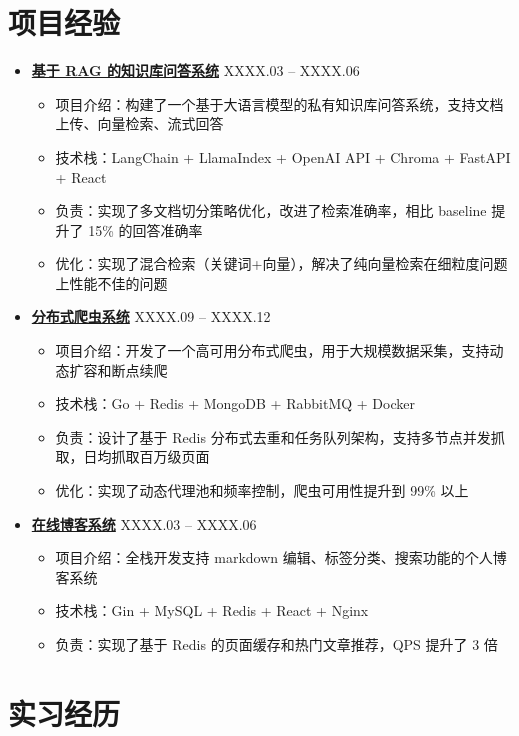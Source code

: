 \documentclass[11pt,a4paper]{article}
\newcommand{\resumeItem}[1]{\item #1}
\newcommand{\resumeProjectHeading}[2]{
  \vspace{-2pt}
  \item
  \textbf{#1} \hfill #2
  \vspace{-5pt}
}
\begin{document}
\section{项目经验}

\begin{itemize}

  \resumeProjectHeading
    {\href{https://github.com/yourusername/project1}{基于 RAG 的知识库问答系统}}{XXXX.03 -- XXXX.06}
  \begin{itemize}
    \resumeItem{项目介绍：构建了一个基于大语言模型的私有知识库问答系统，支持文档上传、向量检索、流式回答}
    \resumeItem{技术栈：LangChain + LlamaIndex + OpenAI API + Chroma + FastAPI + React}
    \resumeItem{负责：实现了多文档切分策略优化，改进了检索准确率，相比 baseline 提升了 15\% 的回答准确率}
    \resumeItem{优化：实现了混合检索（关键词+向量），解决了纯向量检索在细粒度问题上性能不佳的问题}
  \end{itemize}

  \resumeProjectHeading
    {\href{https://github.com/yourusername/project2}{分布式爬虫系统}}{XXXX.09 -- XXXX.12}
  \begin{itemize}
    \resumeItem{项目介绍：开发了一个高可用分布式爬虫，用于大规模数据采集，支持动态扩容和断点续爬}
    \resumeItem{技术栈：Go + Redis + MongoDB + RabbitMQ + Docker}
    \resumeItem{负责：设计了基于 Redis 分布式去重和任务队列架构，支持多节点并发抓取，日均抓取百万级页面}
    \resumeItem{优化：实现了动态代理池和频率控制，爬虫可用性提升到 99\% 以上}
  \end{itemize}

  \resumeProjectHeading
    {\href{https://github.com/yourusername/project3}{在线博客系统}}{XXXX.03 -- XXXX.06}
  \begin{itemize}
    \resumeItem{项目介绍：全栈开发支持 markdown 编辑、标签分类、搜索功能的个人博客系统}
    \resumeItem{技术栈：Gin + MySQL + Redis + React + Nginx}
    \resumeItem{负责：实现了基于 Redis 的页面缓存和热门文章推荐，QPS 提升了 3 倍}
  \end{itemize}

\end{itemize}

\section{实习经历}
\end{document}
